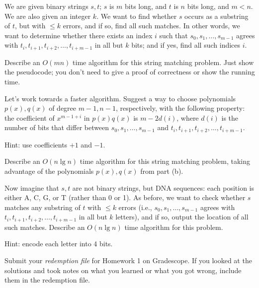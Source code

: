 \begin{qunlist}
\pagebreak
{}

We are given binary strings $s,t$; $s$ is $m$ bits long, and $t$ is $n$ bits long,
and $m<n$.
We are also given an integer $k$.
We want to find whether $s$ occurs as a substring of $t$,
but with $\le k$ errors, and if so, find all such matches.
In other words, we want to determine whether there exists an index $i$
such that $s_0,s_1,\dots,s_{m-1}$ agrees with
$t_i,t_{i+1},t_{i+2},\dots,t_{i+m-1}$ in all but $k$ bits; and if yes,
find all such indices $i$.
\begin{qparts}
\item Describe an $O(mn)$ time algorithm for this string matching problem.
Just show the pseudocode; you don't need to give a proof of correctness
or show the running time.\\

\item Let's work towards a faster algorithm.
Suggest a way to choose polynomials $p(x),q(x)$ of degree $m-1,n-1$,
respectively, with the following property:
the coefficient of $x^{m-1+i}$ in $p(x)q(x)$ is $m-2d(i)$,
where $d(i)$ is the number of bits that differ between
$s_0,s_1,\dots,s_{m-1}$ and $t_i,t_{i+1},t_{i+2},\dots,t_{i+m-1}$.

Hint: use coefficients $+1$ and $-1$.

\item Describe an $O(n \lg n)$ time algorithm for this string matching problem,
taking advantage of the polynomials $p(x),q(x)$ from part (b).

\item Now imagine that $s,t$ are not binary strings, but DNA sequences:
each position is either A, C, G, or T (rather than 0 or 1).
As before, we want to check whether $s$ matches any substring of $t$
with $\le k$ errors
(i.e., $s_0,s_1,\dots,s_{m-1}$ agrees with
$t_i,t_{i+1},t_{i+2},\dots,t_{i+m-1}$ in all but $k$ letters),
and if so, output the location of all such matches.
Describe an $O(n \lg n)$ time algorithm for this problem.

Hint: encode each letter into 4 bits.


\end{qparts}


\pagebreak
{}

Submit your \emph{redemption file} for Homework 1 on Gradescope. If you looked at the solutions and took notes on what you learned or what you got wrong, include them in the redemption file. 


\end{qunlist}

